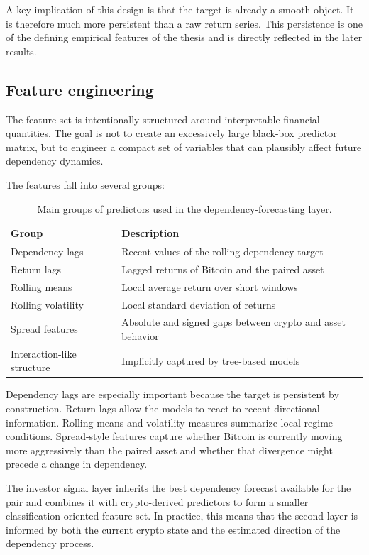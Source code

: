 A key implication of this design is that the target is already a smooth object. It is therefore much more persistent than a raw return series. This persistence is one of the defining empirical features of the thesis and is directly reflected in the later results.

\subsection{Feature engineering}

The feature set is intentionally structured around interpretable financial quantities. The goal is not to create an excessively large black-box predictor matrix, but to engineer a compact set of variables that can plausibly affect future dependency dynamics.

The features fall into several groups:

\begin{table}[H]
    \centering
    \caption{Main groups of predictors used in the dependency-forecasting layer.}
    \label{tab:feature_groups}
    \begin{tabular}{ll}
        \toprule
        Group & Description \\
        \midrule
        Dependency lags & Recent values of the rolling dependency target \\
        Return lags & Lagged returns of Bitcoin and the paired asset \\
        Rolling means & Local average return over short windows \\
        Rolling volatility & Local standard deviation of returns \\
        Spread features & Absolute and signed gaps between crypto and asset behavior \\
        Interaction-like structure & Implicitly captured by tree-based models \\
        \bottomrule
    \end{tabular}
\end{table}

Dependency lags are especially important because the target is persistent by construction. Return lags allow the models to react to recent directional information. Rolling means and volatility measures summarize local regime conditions. Spread-style features capture whether Bitcoin is currently moving more aggressively than the paired asset and whether that divergence might precede a change in dependency.

The investor signal layer inherits the best dependency forecast available for the pair and combines it with crypto-derived predictors to form a smaller classification-oriented feature set. In practice, this means that the second layer is informed by both the current crypto state and the estimated direction of the dependency process.

